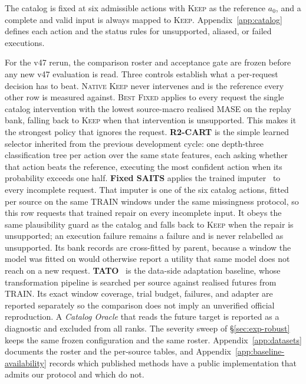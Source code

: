 \documentclass{article}
\begin{document}
The catalog is fixed at six admissible actions with \textsc{Keep} as the reference $a_0$, and
a complete and valid input is always mapped to \textsc{Keep}. Appendix~\ref{app:catalog}
defines each action and the status rules for unsupported, aliased, or failed executions.

For the v47 rerun, the comparison roster and acceptance gate are frozen before any new v47
evaluation is read. Three controls establish what a per-request decision has to
beat. \textsc{Native Keep} never intervenes and is the reference every other row is measured
against. \textsc{Best Fixed} applies to every request the single catalog intervention with the
lowest source-macro realised MASE on the replay bank, falling back to \textsc{Keep} when that
intervention is unsupported. This makes it the strongest policy that
ignores the request. \textbf{R2-CART} is the simple learned selector inherited from the
previous development cycle: one depth-three classification tree per action over the same state
features, each asking whether that action beats the reference, executing the most confident
action when its probability exceeds one half. \textbf{Fixed SAITS} applies the trained
imputer~\citep{du2023saits,du2023pypots} to every incomplete request. That imputer is one of
the six catalog actions, fitted per source on the same TRAIN windows under the same missingness
protocol, so this row requests that trained repair on every incomplete input. It obeys the same
plausibility guard as the catalog and falls back to \textsc{Keep} when the repair is unsupported;
an execution failure remains a failure and is never relabelled as unsupported. Its bank
records are cross-fitted by parent, because a window the model was fitted on would otherwise
report a utility that same model does not reach on a new request.
\textbf{TATO}~\citep{qiu2026tato} is the data-side adaptation baseline, whose
transformation pipeline is searched per source against realised futures from TRAIN. Its exact
window coverage, trial budget, failures, and adapter are reported separately so the comparison
does not imply an unverified official reproduction. A
\emph{Catalog Oracle} that reads the future target is reported as a diagnostic and excluded
from all ranks.
The severity sweep of \S\ref{sec:exp-robust} keeps the same frozen configuration and the same
roster. Appendix~\ref{app:datasets} documents the roster and the per-source tables, and
Appendix~\ref{app:baseline-availability} records which published methods have a public
implementation that admits our protocol and which do not.
\end{document}
